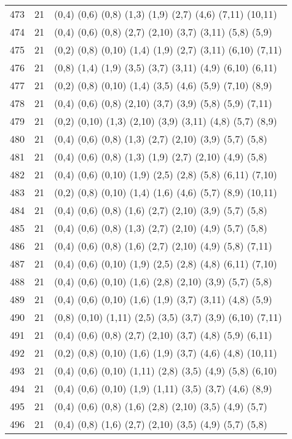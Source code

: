 {\begin{longtable}{lll}
473 & 21 & (0,4) (0,6) (0,8) (1,3) (1,9) (2,7) (4,6) (7,11) (10,11) \\
474 & 21 & (0,4) (0,6) (0,8) (2,7) (2,10) (3,7) (3,11) (5,8) (5,9) \\
475 & 21 & (0,2) (0,8) (0,10) (1,4) (1,9) (2,7) (3,11) (6,10) (7,11) \\
476 & 21 & (0,8) (1,4) (1,9) (3,5) (3,7) (3,11) (4,9) (6,10) (6,11) \\
477 & 21 & (0,2) (0,8) (0,10) (1,4) (3,5) (4,6) (5,9) (7,10) (8,9) \\
478 & 21 & (0,4) (0,6) (0,8) (2,10) (3,7) (3,9) (5,8) (5,9) (7,11) \\
479 & 21 & (0,2) (0,10) (1,3) (2,10) (3,9) (3,11) (4,8) (5,7) (8,9) \\
480 & 21 & (0,4) (0,6) (0,8) (1,3) (2,7) (2,10) (3,9) (5,7) (5,8) \\
481 & 21 & (0,4) (0,6) (0,8) (1,3) (1,9) (2,7) (2,10) (4,9) (5,8) \\
482 & 21 & (0,4) (0,6) (0,10) (1,9) (2,5) (2,8) (5,8) (6,11) (7,10) \\
483 & 21 & (0,2) (0,8) (0,10) (1,4) (1,6) (4,6) (5,7) (8,9) (10,11) \\
484 & 21 & (0,4) (0,6) (0,8) (1,6) (2,7) (2,10) (3,9) (5,7) (5,8) \\
485 & 21 & (0,4) (0,6) (0,8) (1,3) (2,7) (2,10) (4,9) (5,7) (5,8) \\
486 & 21 & (0,4) (0,6) (0,8) (1,6) (2,7) (2,10) (4,9) (5,8) (7,11) \\
487 & 21 & (0,4) (0,6) (0,10) (1,9) (2,5) (2,8) (4,8) (6,11) (7,10) \\
488 & 21 & (0,4) (0,6) (0,10) (1,6) (2,8) (2,10) (3,9) (5,7) (5,8) \\
489 & 21 & (0,4) (0,6) (0,10) (1,6) (1,9) (3,7) (3,11) (4,8) (5,9) \\
490 & 21 & (0,8) (0,10) (1,11) (2,5) (3,5) (3,7) (3,9) (6,10) (7,11) \\
491 & 21 & (0,4) (0,6) (0,8) (2,7) (2,10) (3,7) (4,8) (5,9) (6,11) \\
492 & 21 & (0,2) (0,8) (0,10) (1,6) (1,9) (3,7) (4,6) (4,8) (10,11) \\
493 & 21 & (0,4) (0,6) (0,10) (1,11) (2,8) (3,5) (4,9) (5,8) (6,10) \\
494 & 21 & (0,4) (0,6) (0,10) (1,9) (1,11) (3,5) (3,7) (4,6) (8,9) \\
495 & 21 & (0,4) (0,6) (0,8) (1,6) (2,8) (2,10) (3,5) (4,9) (5,7) \\
496 & 21 & (0,4) (0,8) (1,6) (2,7) (2,10) (3,5) (4,9) (5,7) (5,8) \\

\end{longtable}}

